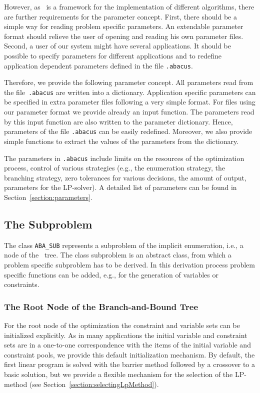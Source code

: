 However, as \ABACUS\ is a framework for the implementation of different
algorithms, there are further requirements for the parameter concept.
First, there should be a simple way for reading problem specific parameters.
An extendable parameter format should relieve the user of opening and
reading his own parameter files. Second, a user of our system might have
several applications. It should be possible to specify parameters
for different applications and to redefine application dependent
parameters defined in the file {\tt .abacus}.

Therefore, we provide the following parameter concept. All parameters
read from the file~{\tt .abacus} are written into a dictionary.
Application specific parameters can be specified in extra parameter
files following a very simple format. For files using our parameter
format we provide already an input function. The parameters read by
this input function are also written to the parameter dictionary. Hence,
parameters of the file {\tt .abacus} can be easily redefined.
Moreover, we also provide simple functions to extract the values of the
parameters from the dictionary.

The parameters in {\tt .abacus} include limits on the resources of the optimization
process, control of various strategies (e.g., the enumeration strategy,
the branching strategy, zero tolerances for various decisions, the amount
of output, parameters for the LP-solver).
A detailed list of parameters can be found in 
Section~\ref{section:parameters}.

\subsection{The Subproblem}
\label{section:DesignSubproblem}

The class {\tt ABA\_SUB} represents 
a subproblem of the implicit enumeration, i.e.,
a node of the \bab\ tree. The class subproblem is an abstract class,
from which a problem specific subproblem has to be derived. In this
derivation process problem specific functions can be added,
e.g., for the generation of variables or constraints.

\subsubsection{The Root Node of the Branch-and-Bound Tree}

For the root node of the optimization the constraint and
variable sets can be initialized explicitly. As in many applications
the initial variable and constraint sets are in a one-to-one correspondence
with the items of the initial variable and constraint pools, 
we provide this default initialization
mechanism. By default, the first linear program is solved with the barrier
method followed by a crossover to a basic solution, 
but we provide a flexible mechanism for the selection of the LP-method
(see Section~\ref{section:selectingLpMethod}).

